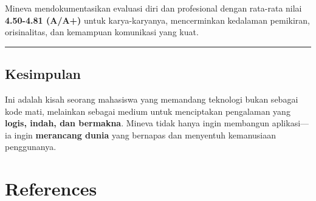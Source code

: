 \documentclass[
  letterpaper,
  DIV=11,
  numbers=noendperiod]{scrreprt}
\begin{document}
Mineva mendokumentasikan evaluasi diri dan profesional dengan rata-rata
nilai \textbf{4.50-4.81 (A/A+)} untuk karya-karyanya, mencerminkan
kedalaman pemikiran, orisinalitas, dan kemampuan komunikasi yang kuat.

\begin{center}\rule{0.5\linewidth}{0.5pt}\end{center}

\section{Kesimpulan}\label{kesimpulan}

Ini adalah kisah seorang mahasiswa yang memandang teknologi bukan
sebagai kode mati, melainkan sebagai medium untuk menciptakan pengalaman
yang \textbf{logis, indah, dan bermakna}. Mineva tidak hanya ingin
membangun aplikasi---ia ingin \textbf{merancang dunia} yang bernapas dan
menyentuh kemanusiaan penggunanya.


\chapter*{References}\label{references}


\label{refs}
\end{document}

